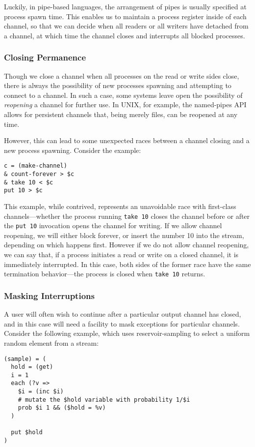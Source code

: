 \documentclass[english,preprint,JIP,uplatex]{ipsj}
\begin{document}
Luckily, in pipe-based languages, the arrangement of pipes is usually specified at process spawn time. This enables us to maintain a process register inside of each channel, so that we can decide when all readers or all writers have detached from a channel, at which time the channel closes and interrupts all blocked processes.

\subsubsection{Closing Permanence}\label{closing-permanence}\noindent
Though we close a channel when all processes on the read or write sides close, there is always the possibility of new processes spawning and attempting to connect to a channel. In such a case, some systems leave open the possibility of \emph{reopening} a channel for further use. In UNIX, for example, the named-pipes API allows for persistent channels \cite{linux-pipe} that, being merely files, can be reopened at any time.

However, this can lead to some unexpected races between a channel closing and a new process spawning. Consider the example:
\begin{lstlisting}
c = (make-channel)
& count-forever > $c
& take 10 < $c
put 10 > $c
\end{lstlisting}

\noindent
This example, while contrived, represents an unavoidable race with first-class channels---whether the process running \verb/take 10/ closes the channel before or
after the \verb/put 10/ invocation opens the channel for writing. If we allow channel reopening, we will either block forever, or insert the number 10 into the stream, depending on which happens first. However if we do not allow channel reopening, we can say that, if a process initiates a read or write on a closed channel, it is immediately interrupted. In this case, both sides of the former race have the same termination behavior---the process is closed when \verb/take 10/ returns.

\subsubsection{Masking Interruptions}\label{masking}\noindent
A user will often wish to continue after a particular output channel has closed, and in this case will need a facility to mask exceptions for particular channels. Consider the following example, which uses reservoir-sampling to select a uniform random element from a stream:
\begin{lstlisting}
(sample) = (
  hold = (get)
  i = 1
  each (?v =>
    $i = (inc $i)
    # mutate the $hold variable with probability 1/$i
    prob $i 1 && ($hold = %v)
  )

  put $hold
)
\end{lstlisting}
\end{document}
